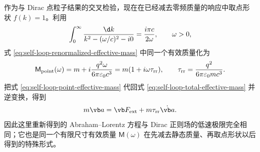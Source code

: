 作为与 Dirac 点粒子结果的交叉检验，现在在已经减去零频质量的响应中取点形状 $f(k)=1$。利用
\begin{equation*}
 \int_0^\infty{\d k\over k^2-(\omega/c)^2-i0}
 ={i\pi c\over2\omega},
 \qquad \omega>0,
\end{equation*}
式 \eqref{eq:self-loop-renormalized-effective-mass} 中同一个有效质量化为
\begin{equation}
 \mathsf M_{\mathrm{point}}(\omega)
 =m+i{q^2\omega\over6\pi\varepsilon_0c^3}
 =m(1+i\omega\tau_{\mathrm{rr}}),
 \qquad
 \tau_{\mathrm{rr}}={q^2\over6\pi\varepsilon_0mc^3}.
 \label{eq:self-loop-point-effective-mass}
\end{equation}
把式 \eqref{eq:self-loop-point-effective-mass} 代回式 \eqref{eq:self-loop-total-effective-mass} 并逆变换，得到
\begin{equation}
 m\vb a
 =\vb F_{\mathrm{ext}}+m\tau_{\mathrm{rr}}\dot{\vb a}.
 \label{eq:self-loop-AL-from-mass}
\end{equation}
因此这里重新得到的 Abraham--Lorentz 方程与 Dirac 正则场的低速极限完全相同；它也是同一个有限尺寸有效质量 $\mathsf M(\omega)$ 在先减去静态质量、再取点形状以后得到的特殊形式。

